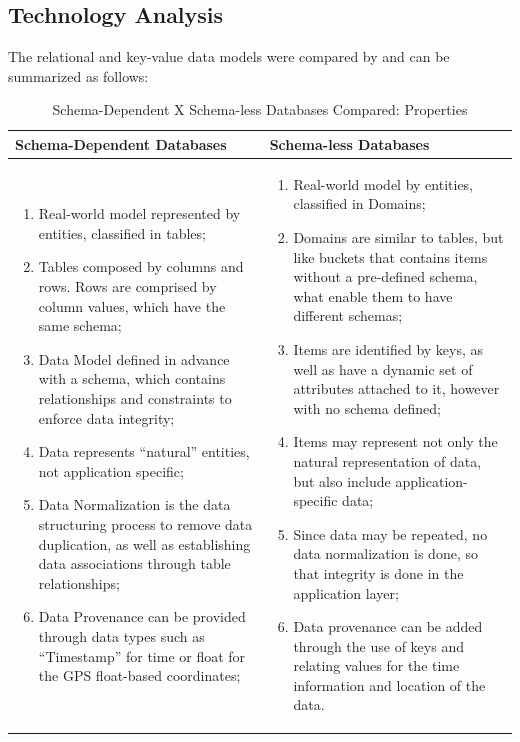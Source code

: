 \subsection{Technology Analysis}

The relational and key-value data models were compared by
\cite{db-is-rdbs-dommed} and can be summarized as follows: 

\begin{table}
    \label{tab:ysi-data-distribution}
    \caption{Schema-Dependent X Schema-less Databases Compared: Properties}
    \begin{center}
    \begin{tabular}{|p{210pt}|p{210pt}|}\hline
    Schema-Dependent Databases & Schema-less Databases\\\hline
    \begin{enumerate}
      \item Real-world model represented by entities, classified in tables;
      \item Tables composed by columns and rows. Rows are comprised by column
      values, which have the same schema;
      \item Data Model defined in advance with a schema, which contains
      relationships and constraints to enforce data integrity;
      \item Data represents ``natural'' entities, not application specific;
      \item Data Normalization is the data structuring process to remove data
      duplication, as well as establishing data associations through table
      relationships;
      \item Data Provenance can be provided through data types such as
      ``Timestamp'' for time or float for the GPS float-based coordinates; 
    \end{enumerate} 
    & 
    \begin{enumerate}
      \item Real-world model by entities, classified in Domains;
      \item Domains are similar to tables, but like buckets that contains items
      without a pre-defined schema, what enable them to have different schemas;
      \item Items are identified by keys, as well as have a dynamic set of
      attributes attached to it, however with no schema defined;
      \item Items may represent not only the natural representation of data, but
      also include application-specific data;
      \item Since data may be repeated, no data normalization is done, so that
      integrity is done in the application layer;
      \item Data provenance can be added through the use of keys and relating
      values for the time information and location of the data.
    \end{enumerate}
    \\\hline
    \end{tabular}
    \end{center}
\end{table}

